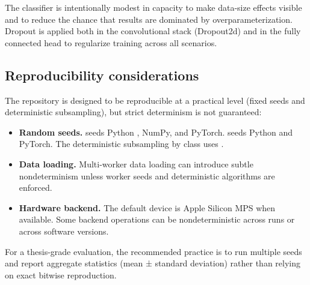 The classifier is intentionally modest in capacity to make data-size effects visible and to reduce the chance that results are dominated by overparameterization. Dropout is applied both in the convolutional stack (Dropout2d) and in the fully connected head to regularize training across all scenarios.

\subsection{Reproducibility considerations}

The repository is designed to be reproducible at a practical level (fixed seeds and deterministic subsampling), but strict determinism is not guaranteed:
\begin{itemize}
\item \textbf{Random seeds.}  seeds Python , NumPy, and PyTorch.  seeds Python  and PyTorch. The deterministic subsampling by class uses .
\item \textbf{Data loading.} Multi-worker data loading can introduce subtle nondeterminism unless worker seeds and deterministic algorithms are enforced.
\item \textbf{Hardware backend.} The default device is Apple Silicon MPS when available. Some backend operations can be nondeterministic across runs or across software versions.
\end{itemize}

For a thesis-grade evaluation, the recommended practice is to run multiple seeds and report aggregate statistics (mean ± standard deviation) rather than relying on exact bitwise reproduction.
